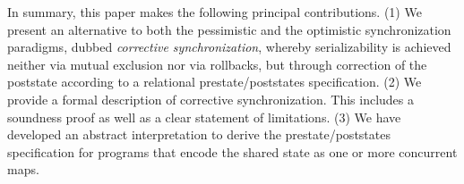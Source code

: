 %
%
%
%


In summary, this paper makes the following principal contributions.
  (1) We present an alternative to both the pessimistic and the optimistic synchronization paradigms, dubbed \emph{corrective synchronization}, whereby serializability is achieved neither via mutual exclusion nor via rollbacks, but through correction of the poststate according to a relational prestate/poststates specification.
(2) We provide a formal description of corrective synchronization. This includes a soundness proof as well as a clear statement of limitations.
	(3) We have developed an abstract interpretation to derive the prestate/poststates specification for programs that encode the shared state as one or more concurrent maps. 

